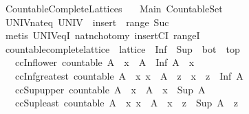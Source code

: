 %
\begin{isabellebody}%
%
%
\isadelimdocument
%
\endisadelimdocument
%
\isatagdocument
%
\isamarkuptrue%
%
\endisatagdocument
{\isafolddocument}%
%
\isadelimdocument
%
\endisadelimdocument
%
\isadelimtheory
%
\endisadelimtheory
%
\isatagtheory
{}\isamarkupfalse%
\ Countable{\isacharunderscore}Complete{\isacharunderscore}Lattices\isanewline
\ \ \ Main\ Countable{\isacharunderscore}Set\isanewline
{}%
\endisatagtheory
{\isafoldtheory}%
%
\isadelimtheory
\isanewline
%
\endisadelimtheory
\isanewline
{}\isamarkupfalse%
\ UNIV{\isacharunderscore}nat{\isacharunderscore}eq{\isacharcolon}\ {\isachardoublequoteopen}UNIV\ {\isacharequal}\ insert\ {}\ {\isacharparenleft}range\ Suc{\isacharparenright}{\isachardoublequoteclose}\isanewline
%
\isadelimproof
\ \ %
\endisadelimproof
%
\isatagproof
{}\isamarkupfalse%
\ {\isacharparenleft}metis\ UNIV{\isacharunderscore}eq{\isacharunderscore}I\ nat{\isachardot}nchotomy\ insertCI\ rangeI{\isacharparenright}%
\endisatagproof
{\isafoldproof}%
%
\isadelimproof
\isanewline
%
\endisadelimproof
\isanewline
{}\isamarkupfalse%
\ countable{\isacharunderscore}complete{\isacharunderscore}lattice\ {\isacharequal}\ lattice\ {\isacharplus}\ Inf\ {\isacharplus}\ Sup\ {\isacharplus}\ bot\ {\isacharplus}\ top\ {\isacharplus}\isanewline
\ \ \ ccInf{\isacharunderscore}lower{\isacharcolon}\ {\isachardoublequoteopen}countable\ A\ {\isasymLongrightarrow}\ x\ {\isasymin}\ A\ {\isasymLongrightarrow}\ Inf\ A\ {\isasymle}\ x{\isachardoublequoteclose}\isanewline
\ \ \ ccInf{\isacharunderscore}greatest{\isacharcolon}\ {\isachardoublequoteopen}countable\ A\ {\isasymLongrightarrow}\ {\isacharparenleft}{\isasymAnd}x{\isachardot}\ x\ {\isasymin}\ A\ {\isasymLongrightarrow}\ z\ {\isasymle}\ x{\isacharparenright}\ {\isasymLongrightarrow}\ z\ {\isasymle}\ Inf\ A{\isachardoublequoteclose}\isanewline
\ \ \ ccSup{\isacharunderscore}upper{\isacharcolon}\ {\isachardoublequoteopen}countable\ A\ {\isasymLongrightarrow}\ x\ {\isasymin}\ A\ {\isasymLongrightarrow}\ x\ {\isasymle}\ Sup\ A{\isachardoublequoteclose}\isanewline
\ \ \ ccSup{\isacharunderscore}least{\isacharcolon}\ {\isachardoublequoteopen}countable\ A\ {\isasymLongrightarrow}\ {\isacharparenleft}{\isasymAnd}x{\isachardot}\ x\ {\isasymin}\ A\ {\isasymLongrightarrow}\ x\ {\isasymle}\ z{\isacharparenright}\ {\isasymLongrightarrow}\ Sup\ A\ {\isasymle}\ z{\isachardoublequoteclose}\isanewline

\end{isabellebody}
